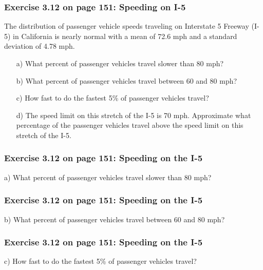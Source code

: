 \documentclass[handout]{beamer}
\begin{document}
\begin{frame}
\frametitle{Exercise 3.12 on page 151: Speeding on I-5}
The distribution of passenger vehicle speeds traveling on Interstate 5 Freeway (I-5) in California is nearly normal with a mean of 72.6 mph and a standard deviation of 4.78 mph.

\vspace{0.25cm}

\begin{enumerate}
\item[a)] What percent of passenger vehicles travel slower than 80 mph?
\item[b)] What percent of passenger vehicles travel between 60 and 80 mph?
\item[c)] How fast to do the fastest 5\% of passenger vehicles travel?
\item[d)] The speed limit on this stretch of the I-5 is 70 mph. Approximate what percentage of
the passenger vehicles travel above the speed limit on this stretch of the I-5.
\end{enumerate}

\end{frame}


\begin{frame}
\frametitle{Exercise 3.12 on page 151: Speeding on the I-5}
a) What percent of passenger vehicles travel slower than 80 mph?

\vspace{7cm}

\end{frame}


\begin{frame}
\frametitle{Exercise 3.12 on page 151: Speeding on the I-5}
b) What percent of passenger vehicles travel between 60 and 80 mph?

\vspace{7cm}

\end{frame}


\begin{frame}
\frametitle{Exercise 3.12 on page 151: Speeding on the I-5}
c) How fast to do the fastest 5\% of passenger vehicles travel?

\vspace{7cm}

\end{frame}
\end{document}
